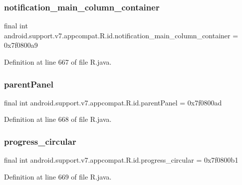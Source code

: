 \subsubsection{\texorpdfstring{notification\_main\_column\_container}{notification\_main\_column\_container}}
{\footnotesize\ttfamily final int android.\+support.\+v7.\+appcompat.\+R.\+id.\+notification\+\_\+main\+\_\+column\+\_\+container = 0x7f0800a9\hspace{0.3cm}{\ttfamily [static]}}



Definition at line 667 of file R.\+java.

\mbox{\label{classandroid_1_1support_1_1v7_1_1appcompat_1_1_r_1_1id_a908539fdb58bb6e7cbd117c4fa035dab}} 
\subsubsection{\texorpdfstring{parentPanel}{parentPanel}}
{\footnotesize\ttfamily final int android.\+support.\+v7.\+appcompat.\+R.\+id.\+parent\+Panel = 0x7f0800ad\hspace{0.3cm}{\ttfamily [static]}}



Definition at line 668 of file R.\+java.

\mbox{\label{classandroid_1_1support_1_1v7_1_1appcompat_1_1_r_1_1id_a78d6f86a1eb6df15a9a5c3b5afb779cf}} 
\subsubsection{\texorpdfstring{progress\_circular}{progress\_circular}}
{\footnotesize\ttfamily final int android.\+support.\+v7.\+appcompat.\+R.\+id.\+progress\+\_\+circular = 0x7f0800b1\hspace{0.3cm}{\ttfamily [static]}}



Definition at line 669 of file R.\+java.

